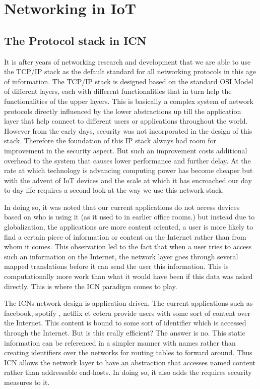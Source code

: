 \section{Networking in IoT}
\label{sec:domain-survey}
\subsection{The Protocol stack in ICN}

\label{subsec: The Protocol stack in ICN}
It is after years of networking research and development that we are able to use the TCP/IP stack as the default standard for all networking protocols in this age of information. The TCP/IP stack is designed based on the standard OSI Model of different layers, each with different functionalities that in turn help the functionalities of the upper layers. This is basically a complex system of network protocols directly influenced by the lower abstractions up till the application layer that help connect to different users or applications throughout the world. However from the early days, security was not incorporated in the design of this stack. Therefore the foundation of this IP stack always had room for improvement in the security aspect. But such an improvement costs additional overhead to the system that causes lower performance and further delay. At the rate at which technology is advancing computing power has become cheaper but with the advent of IoT devices and the scale at which it has encroached our day to day life requires a second look at the way we use this network stack.\par
In doing so, it was noted that our current applications do not access devices based on who is using it (as it used to in earlier office rooms.) but instead due to globalization, the applications are more content oriented, a user is more likely to find a certain piece of information or content on the Internet rather than from whom it comes. This observation led to the fact that when a user tries to access such an information on the Internet, the network layer goes through several mapped translations before it can send the user this information. This is computationally more work than what it would have been if this data was asked directly. This is where the ICN paradigm comes to play.\par
The ICNs network design is application driven. The current applications such as facebook, spotify , netflix et cetera provide users with some sort of content over the Internet. This content is bound to some sort of identifier which is accessed through the Internet. But is this really efficient? The answer is no. This static information can be referenced in a simpler manner with names rather than creating identifiers over the networks for routing tables to forward around. Thus ICN allows the network layer to have an abstraction that accesses named content rather than addressable end-hosts. In doing so, it also adds the requires security measures to it.\par

